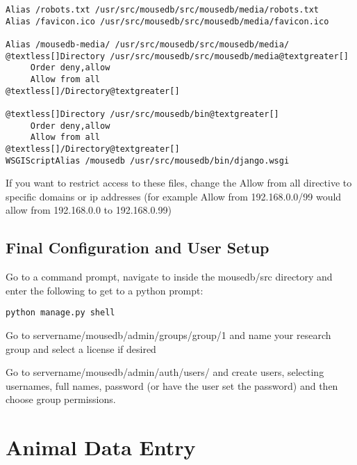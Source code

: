 \documentclass[letterpaper,10pt,english]{sphinxmanual}
\begin{document}
\begin{Verbatim}[commandchars=@\[\]]
Alias /robots.txt /usr/src/mousedb/src/mousedb/media/robots.txt
Alias /favicon.ico /usr/src/mousedb/src/mousedb/media/favicon.ico

Alias /mousedb-media/ /usr/src/mousedb/src/mousedb/media/
@textless[]Directory /usr/src/mousedb/src/mousedb/media@textgreater[]
     Order deny,allow
     Allow from all
@textless[]/Directory@textgreater[]

@textless[]Directory /usr/src/mousedb/bin@textgreater[]
     Order deny,allow
     Allow from all
@textless[]/Directory@textgreater[]
WSGIScriptAlias /mousedb /usr/src/mousedb/bin/django.wsgi
\end{Verbatim}

If you want to restrict access to these files, change the Allow from all directive to specific domains or ip addresses (for example Allow from 192.168.0.0/99 would allow from 192.168.0.0 to 192.168.0.99)


\section{Final Configuration and User Setup}
\label{installation:final-configuration-and-user-setup}
Go to a command prompt, navigate to inside the mousedb/src directory and enter the following to get to a python prompt:

\begin{Verbatim}[commandchars=@\[\]]
python manage.py shell
\end{Verbatim}

Go to servername/mousedb/admin/groups/group/1 and name your research group and select a license if desired

Go to servername/mousedb/admin/auth/users/ and create users, selecting usernames, full names, password (or have the user set the password) and then choose group permissions.


\chapter{Animal Data Entry}
\label{usage:animal-data-entry}\label{usage::doc}
\end{document}
